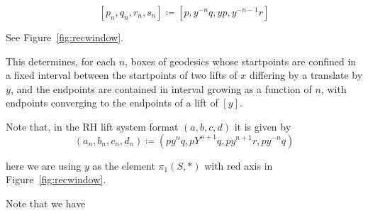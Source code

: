     \[
      [p_n,q_n,r_n,s_n] \coloneqq [p,y^{-n}q,yp,y^{-n-1}r]
    \]
    
    See Figure~\ref{fig:recwindow}.
    
           \begin{figure}
\end{figure}
    
    This determines, for each $n$, boxes of geodesics whose startpoints are confined in a fixed interval between the startpoints of two lifts of $x$ differing by a translate by $y$, and the endpoints are contained in interval growing as a function of $n$, with endpoints converging to the endpoints of a lift of $[y]$.
    
    Note that, in the RH lift system format $(a,b,c,d)$ it is given by
    \[
      (a_n,b_n,c_n,d_n) \coloneqq (py^nq, pY^{n+1}q,py^{n+1}r,py^{-n}q)
    \]
    
    here we are using $y$ as the element $\pi_1(S,*)$ with red axis in Figure~\ref{fig:recwindow}.
    \item 

       
       \begin{figure}
\end{figure}
       

       
       

    
    Note that we have
    
